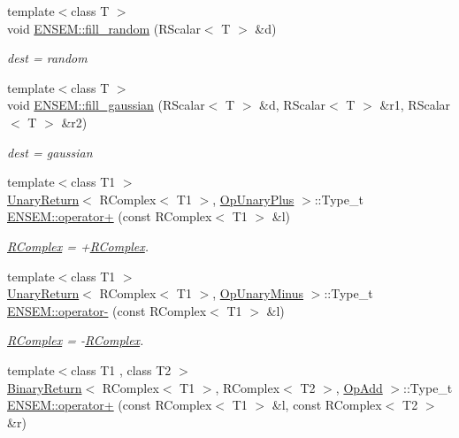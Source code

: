 \begin{DoxyCompactItemize}
{\footnotesize template$<$class T $>$ }\\void \mbox{\hyperlink{group__rscalar_ga02bacd2a18d81f6f0e7d137a7d21ee23}{E\+N\+S\+E\+M\+::fill\+\_\+random}} (R\+Scalar$<$ T $>$ \&d)
\begin{DoxyCompactList}\small\item\em dest = random \end{DoxyCompactList}\item 
{\footnotesize template$<$class T $>$ }\\void \mbox{\hyperlink{group__rscalar_gaaefd5c2ab83b53fd225f3198277789f3}{E\+N\+S\+E\+M\+::fill\+\_\+gaussian}} (R\+Scalar$<$ T $>$ \&d, R\+Scalar$<$ T $>$ \&r1, R\+Scalar$<$ T $>$ \&r2)
\begin{DoxyCompactList}\small\item\em dest = gaussian \end{DoxyCompactList}\item 
{\footnotesize template$<$class T1 $>$ }\\\mbox{\hyperlink{structUnaryReturn}{Unary\+Return}}$<$ R\+Complex$<$ T1 $>$, \mbox{\hyperlink{structOpUnaryPlus}{Op\+Unary\+Plus}} $>$\+::Type\+\_\+t \mbox{\hyperlink{group__rcomplex_ga7b4d2aabc48b7a45a328cf586ea8d5f0}{E\+N\+S\+E\+M\+::operator+}} (const R\+Complex$<$ T1 $>$ \&l)
\begin{DoxyCompactList}\small\item\em \mbox{\hyperlink{classENSEM_1_1RComplex}{R\+Complex}} = +\mbox{\hyperlink{classENSEM_1_1RComplex}{R\+Complex}}. \end{DoxyCompactList}\item 
{\footnotesize template$<$class T1 $>$ }\\\mbox{\hyperlink{structUnaryReturn}{Unary\+Return}}$<$ R\+Complex$<$ T1 $>$, \mbox{\hyperlink{structOpUnaryMinus}{Op\+Unary\+Minus}} $>$\+::Type\+\_\+t \mbox{\hyperlink{group__rcomplex_ga1b707b6c08424743d1f21d7162f4553b}{E\+N\+S\+E\+M\+::operator-\/}} (const R\+Complex$<$ T1 $>$ \&l)
\begin{DoxyCompactList}\small\item\em \mbox{\hyperlink{classENSEM_1_1RComplex}{R\+Complex}} = -\/\mbox{\hyperlink{classENSEM_1_1RComplex}{R\+Complex}}. \end{DoxyCompactList}\item 
{\footnotesize template$<$class T1 , class T2 $>$ }\\\mbox{\hyperlink{structBinaryReturn}{Binary\+Return}}$<$ R\+Complex$<$ T1 $>$, R\+Complex$<$ T2 $>$, \mbox{\hyperlink{structOpAdd}{Op\+Add}} $>$\+::Type\+\_\+t \mbox{\hyperlink{group__rcomplex_ga4d7e8b93db619c9854c1e6fa23a3a454}{E\+N\+S\+E\+M\+::operator+}} (const R\+Complex$<$ T1 $>$ \&l, const R\+Complex$<$ T2 $>$ \&r)

\end{DoxyCompactItemize}
